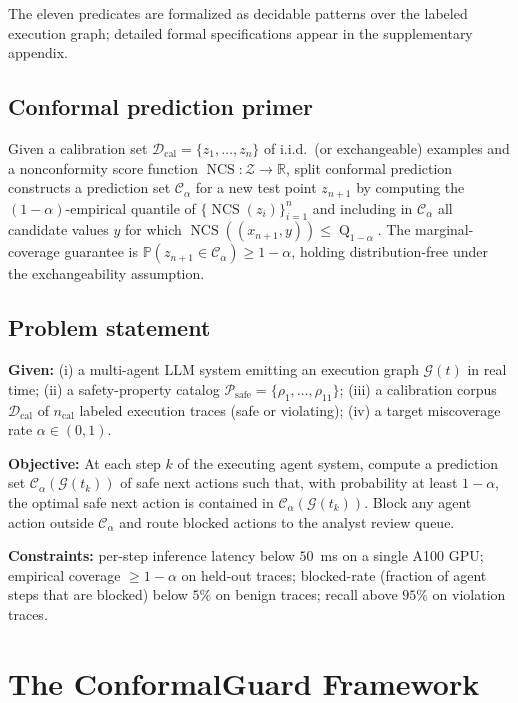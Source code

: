 \documentclass[12pt,a4paper]{article}
\theoremstyle{definition}
\theoremstyle{remark}
\newcommand{\modelname}{ConformalGuard}
\newcommand{\R}{\mathbb{R}}
\providecommand{\Prob}{}\renewcommand{\Prob}{\mathbb{P}}
\newcommand{\Dcal}{\mathcal{D}}
\newcommand{\Zcal}{\mathcal{Z}}
\newcommand{\Ccal}{\mathcal{C}}
\newcommand{\Gcal}{\mathcal{G}}
\DeclareMathOperator{\NCS}{NCS}
\DeclareMathOperator{\quant}{Q}
\begin{document}
The eleven predicates are formalized as decidable patterns over the labeled execution graph; detailed formal specifications appear in the supplementary appendix.

\subsection{Conformal prediction primer}

Given a calibration set $\Dcal_{\mathrm{cal}} = \{z_1, \ldots, z_n\}$ of i.i.d.\ (or exchangeable) examples and a nonconformity score function $\NCS: \Zcal \to \R$, split conformal prediction~\cite{lei2018distribution} constructs a prediction set $\Ccal_\alpha$ for a new test point $z_{n+1}$ by computing the $(1-\alpha)$-empirical quantile of $\{\NCS(z_i)\}_{i=1}^n$ and including in $\Ccal_\alpha$ all candidate values $y$ for which $\NCS((x_{n+1}, y)) \leq \quant_{1-\alpha}$. The marginal-coverage guarantee is $\Prob(z_{n+1} \in \Ccal_\alpha) \geq 1 - \alpha$, holding distribution-free under the exchangeability assumption.

\subsection{Problem statement}

\noindent\textbf{Given:} (i) a multi-agent LLM system emitting an execution graph $\Gcal(t)$ in real time; (ii) a safety-property catalog $\mathcal{P}_{\mathrm{safe}} = \{\rho_1, \ldots, \rho_{11}\}$; (iii) a calibration corpus $\Dcal_{\mathrm{cal}}$ of $n_{\mathrm{cal}}$ labeled execution traces (safe or violating); (iv) a target miscoverage rate $\alpha \in (0, 1)$.

\noindent\textbf{Objective:} At each step $k$ of the executing agent system, compute a prediction set $\Ccal_\alpha(\Gcal(t_k))$ of safe next actions such that, with probability at least $1 - \alpha$, the optimal safe next action is contained in $\Ccal_\alpha(\Gcal(t_k))$. Block any agent action outside $\Ccal_\alpha$ and route blocked actions to the analyst review queue.

\noindent\textbf{Constraints:} per-step inference latency below $50$~ms on a single A100 GPU; empirical coverage $\geq 1 - \alpha$ on held-out traces; blocked-rate (fraction of agent steps that are blocked) below $5\%$ on benign traces; recall above $95\%$ on violation traces.


\section{The \modelname{} Framework}
\label{sec:framework}
\end{document}
